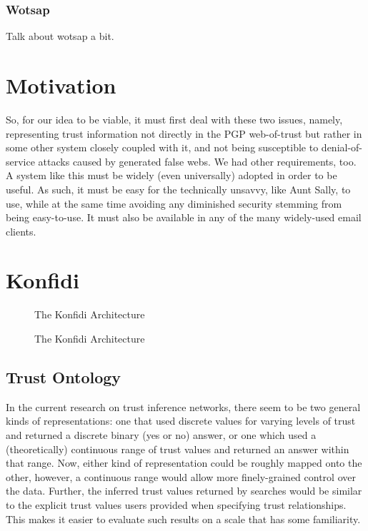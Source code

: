\documentclass{acm_proc_article-sp}
\begin{document}
\subsubsection{Wotsap}
\label{wotsap}
Talk about wotsap a bit.

\section{Motivation}
So, for our idea to be viable, it must first deal with these two issues, namely, representing trust information not directly in the PGP web-of-trust but rather in some other system closely coupled with it, and not being susceptible to denial-of-service attacks caused by generated false webs. We had other requirements, too. A system like this must be widely (even universally) adopted in order to be useful. As such, it must be easy for the technically unsavvy, like Aunt Sally, to use, while at the same time avoiding any diminished security stemming from being easy-to-use. It must also be available in any of the many widely-used email clients. 

\section{Konfidi}
\begin{figure*}
\centering
{}
\caption{The Konfidi Architecture}
\end{figure*}

\begin{figure*}
\centering
{}
\caption{The Konfidi Architecture}
\end{figure*}

\subsection{Trust Ontology}
In the current research on trust inference networks, there seem to be two general kinds of representations:  one that used discrete values for varying levels of trust and returned a discrete binary (yes or no) answer, or one which used a (theoretically) continuous range of trust values and returned an answer within that range.  Now, either kind of representation could be roughly mapped onto the other, however, a continuous range would allow more finely-grained control over the data.  Further, the inferred trust values returned by searches would be similar to the explicit trust values users provided when specifying trust relationships.  This makes it easier to evaluate such results on a scale that has some familiarity.
\end{document}
